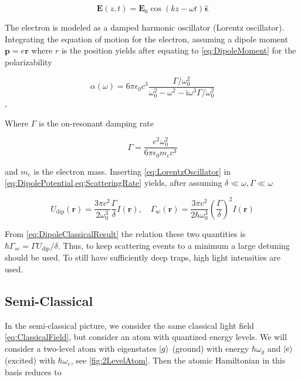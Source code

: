 \begin{equation}\label{eq:ClassicalField}
	\mathbf{E}(z,t) = \mathbf{E}_0 \cos{(k z - \omega t)} 	\bm{\hat{\epsilon}}
\end{equation}
	 
The electron is modeled as a damped harmonic oscillator (Lorentz oscillator). Integrating the equation of motion for the electron, assuming a dipole moment $\mathbf{p} = e \mathbf{r}$ where $r$ is the position yields after equating to \cref{eq:DipoleMoment} for the polarizability \cite{Grimm2000}

\begin{equation}\label{eq:LorentzOscillator}
	\alpha(\omega)=6 \pi \epsilon_{0} c^{3} \frac{\Gamma / \omega_{0}^{2}}{\omega_{0}^{2}-\omega^{2}-\mathrm{i}\omega^3\Gamma/\omega_0^2}
\end{equation},

Where $\Gamma$ is the on-resonant damping rate

\begin{equation}\label{eq:ResonantDampingRate}
	\Gamma = \frac{e^2 \omega_0^2}{6\pi \epsilon_0 m_e c^3}
\end{equation}

and $m_e$ is the electron mass. Inserting \cref{eq:LorentzOscillator} in \cref{eq:DipolePotential,eq:ScatteringRate} yields, after assuming $\delta \ll \omega, \Gamma \ll \omega$

\begin{equation}\label{eq:DipoleClassicalResult} 
	U_{\text{dip}}(\mathbf{r}) = 
	\frac{3\pi c^2}{2\omega_0^3}\frac{\Gamma}{\delta} I(\mathbf{r}),
	\quad
	\Gamma_{\text{sc}}(\mathbf{r}) = 
	\frac{3\pi c^2}{2\hbar\omega_0^3}\left(\frac{\Gamma}{\delta}\right)^2 I(\mathbf{r})
\end{equation}

From \cref{eq:DipoleClassicalResult} the relation these two quantities is $\hbar \Gamma_{sc} =\Gamma U_{\text{dip}}/\delta$. 
Thus, to keep scattering events to a minimum a large detuning should be used.
To still have sufficiently deep traps, high light intensities are used. 


\subsection{Semi-Classical}

In the semi-classical picture, we consider the same classical light field \cref{eq:ClassicalField}, but consider an atom with quantized energy levels. 
We will consider a two-level atom with eigenstates $\lvert g\rangle$ (ground) with energy $\hbar \omega_g$ and $\lvert e\rangle$ (excited) with $\hbar \omega_e$, see \cref{fig:2LevelAtom}. 
Then the atomic Hamiltonian in this basis reduces to \cite{Loudon2000}

